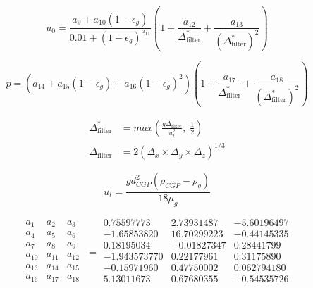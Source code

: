 \begin{equation}
    u_0 = \frac{a_9 + a_{10} (1 - \epsilon_g)}{0.01 + (1 - \epsilon_g)^{a_{11}}} \left(1 + \frac{a_{12}}{\Delta_{\text{filter}}^*} + \frac{a_{13}}{(\Delta_{\text{filter}}^*)^2} \right)
\end{equation}

\begin{equation}
    p = \left(a_{14} + a_{15}(1 - \epsilon_g) + a_{16}(1 - \epsilon_g)^2 \right) \left(1 + \frac{a_{17}}{\Delta_{\text{filter}}^*} + \frac{a_{18}}{(\Delta_{\text{filter}}^*)^2} \right)
\end{equation}

\begin{align}
    \Delta_{\text{filter}}^* &= max\left( \frac{g \Delta_{\text{filter}}}{u_t^2}, \; \frac{1}{2} \right) \\
    \Delta_{\text{filter}} &= 2 (\Delta_x \times \Delta_y \times \Delta_z)^{1/3}
\end{align}

\begin{equation}
    u_t = \frac{g d_{CGP}^2 (\rho_{CGP} - \rho_g)}{18 \mu_g}
\end{equation}

\begin{equation}
    \begin{matrix}
        a_1    & a_2    & a_3 \\
        a_4    & a_5    & a_6 \\
        a_7    & a_8    & a_9 \\
        a_{10} & a_{11} & a_{12} \\
        a_{13} & a_{14} & a_{15} \\
        a_{16} & a_{17} & a_{18} \\
    \end{matrix}
    \; =
    \begin{array}{rrr}
        0.75597773   & 2.73931487  & -5.60196497 \\
        -1.65853820  & 16.70299223 & -0.44145335 \\
        0.18195034   & -0.01827347 & 0.28441799  \\
        -1.943573770 & 0.22177961  & 0.31175890  \\
        -0.15971960  & 0.47750002  & 0.062794180 \\
        5.13011673   & 0.67680355  & -0.54535726 \\
    \end{array}
\end{equation}
